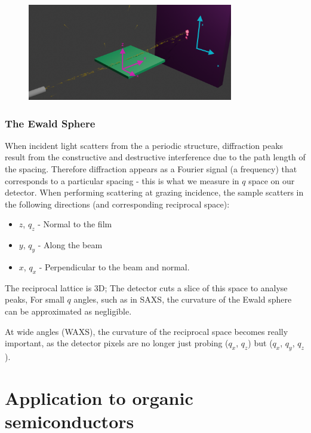 \documentclass[../main.tex]{subfiles}
\begin{document}
				\begin{figure}[H]
					\centering
					\includegraphics[width=0.8\textwidth]{resources/ch5/GrasingIncidence-0052_labelled}
					\caption{}
					\label{fig:ch5-SAXS-GI}
				\end{figure}
				
				\subsubsection{The Ewald Sphere}\label{sec:ch5-geoms-grasing_incidence-ewald}
					When incident light scatters from the a periodic structure, diffraction peaks result from the constructive and destructive interference  due to the path length of the spacing. Therefore diffraction appears as a Fourier signal (a frequency) that corresponds to a particular spacing - this is what we measure in $q$ space on our detector.
					When performing scattering at grazing incidence, the sample scatters in the following directions (and corresponding reciprocal space):
					\begin{itemize}
						\item $z$, $q_z$ - Normal to the film
						\item $y$, $q_y$ - Along the beam
						\item $x$, $q_x$ - Perpendicular to the beam and normal.
					\end{itemize}
					
					The reciprocal lattice is 3D; The detector cuts a slice of this space to analyse peaks, 
					For small $q$ angles, such as in SAXS, the curvature of the Ewald sphere can be approximated as negligible.
					
					At wide angles (WAXS), the curvature of the reciprocal space becomes really important, as the detector pixels are no longer just probing ($q_x$, $q_z$) but ($q_x$, $q_y$, $q_z$).
				
				
		\section{Application to organic semiconductors}

\ifSubfilesClassLoaded{
	\printbibliography{}
	\printglossaries
}{} %
	
\end{document}
